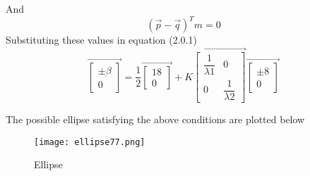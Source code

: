 \documentclass[journal,12pt,twocolumn]{IEEEtran}
\begin{document}
And $$(\vec{p}-\vec{q})^Tm=0$$
Substituting these values in equation (2.0.1)
$$\vec{\begin{bmatrix}\pm \beta \\ 0 \end{bmatrix}}=\dfrac{1}{2}\vec{\begin{bmatrix} 18 \\ 0 \end{bmatrix}}+K \vec{\begin{bmatrix}
\dfrac{1}{\lambda1} & 0 \\
0 & \dfrac{1}{\lambda2}
\end{bmatrix}}\vec{\begin{bmatrix}\pm 8 \\ 0 \end{bmatrix}}$$

The possible ellipse satisfying the above
conditions are plotted below 

\begin{figure}[h]
    \centering
    \texttt{[image: ellipse77.png]}
    \caption{Ellipse}
    \label{Ellipse along given axis}
\end{figure}
\end{document}
